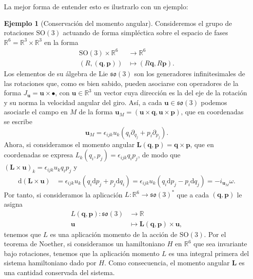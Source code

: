 \documentclass[12pt,a4paper,twoside]{article}
\theoremstyle{definition} \newtheorem{defn}[thm]{Definición}
\theoremstyle{definition} \newtheorem{ejemplo}[thm]{Ejemplo}
\theoremstyle{definition} \newtheorem{ejercicio}[thm]{Ejercicio}
\theoremstyle{remark} \newtheorem*{obs}{Observación}
\def\RR{\mathbb{R}}
\def\dd{\mathrm{d}}
\newcommand{\vect}[1]{\mathbf{#1}}
\begin{document}
  La mejor forma de entender esto es ilustrarlo con un ejemplo:
  \begin{ejemplo}[Conservación del momento angular]
    Consideremos el grupo de rotaciones $\mathrm{SO}(3)$ actuando de forma simpléctica sobre el espacio de fases $\RR^6=\RR^3\times \RR^3$ en la forma
    \begin{align*}
      \mathrm{SO}(3)\times \RR^6&\longrightarrow \RR^6\\ 
      (R,(\vect{q},\vect{p})) &\longmapsto (R\vect{q},R\vect{p}) .
      \end{align*} 
      Los elementos de su álgebra de Lie $\mathfrak{so}(3)$ son los generadores infinitesimales de las rotaciones que, como es bien sabido, pueden asociarse con operadores de la forma $J_{\vect{u}}=\vect{u}\times \bullet$, con $\vect{u}\in \RR^3$ un vector cuya dirección es la del eje de la rotación y su norma la velocidad angular del giro. Así, a cada $\vect{u}\in \mathfrak{so}(3)$ podemos asociarle el campo en $M$ de la forma $\vect{u}_M=(\vect{u}\times \vect{q}, \vect{u}\times \vect{p})$, que en coordenadas se escribe
      \begin{equation*}
	\vect{u}_M=\epsilon_{ijk}u_k(q_i \partial_{q_j}+p_i \partial_{p_j}).
      \end{equation*}
      Ahora, si consideramos el momento angular $\vect{L}(\vect{q},\vect{p})=\vect{q}\times \vect{p}$, que en coordenadas se expresa $L_k(q_i,p_j)=\epsilon_{ijk}q_ip_j$, de modo que $(\vect{L}\times\vect{u})_{k}=\epsilon_{ijk}u_kq_ip_j$ y 
      \begin{align*}
	\dd(\vect{L}\times \vect{u})&=\epsilon_{ijk}u_k(q_i\dd p_j + p_j\dd q_i)=\epsilon_{ijk}u_k(q_i\dd p_j - p_i\dd q_j)=-i_{\vect{u}_M}\omega.
      \end{align*}
      Por tanto, si consideramos la aplicación $L:\RR^6\rightarrow\mathfrak{so}(3)^*$ que a cada $(\vect{q},\vect{p})$ le asigna  
      \begin{align*}
	L(\vect{q},\vect{p}) :\mathfrak{so}(3)&\longrightarrow \RR\\ 
	\vect{u} &\longmapsto \vect{L}(\vect{q},\vect{p})\times \vect{u},
	\end{align*}
	tenemos que $L$ es una aplicación momento de la acción de $\mathrm{SO}(3)$. Por el teorema de Noether, si consideramos un hamiltoniano $H$ en $\RR^6$ que sea invariante bajo rotaciones, tenemos que la aplicación momento $L$ es una integral primera del sistema hamiltoniano dado por $H$. Como consecuencia, el momento angular $\vect{L}$ es una cantidad conservada del sistema.
  \end{ejemplo}
\end{document}
